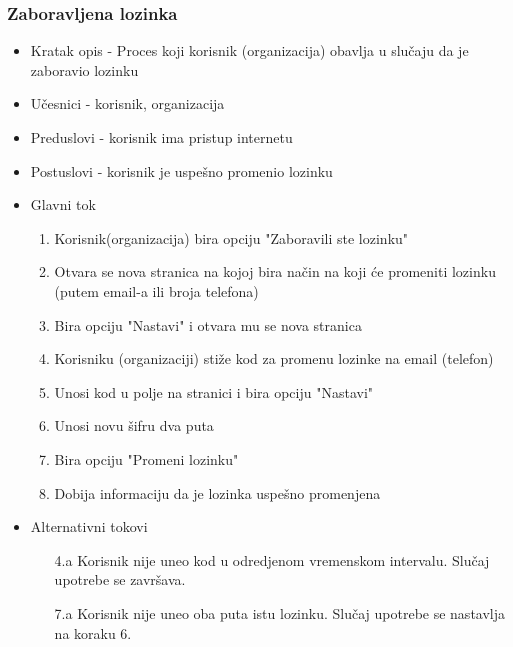 \subsubsection{Zaboravljena lozinka}
\begin{itemize}
    \item Kratak opis - Proces koji korisnik (organizacija) obavlja u slučaju da je zaboravio lozinku
    \item Učesnici - korisnik, organizacija
    \item Preduslovi - korisnik ima pristup internetu
    \item Postuslovi - korisnik je uspešno promenio lozinku
    \item Glavni tok
        \begin{enumerate}
	        \item Korisnik(organizacija) bira opciju "Zaboravili ste lozinku"
	        \item Otvara se nova stranica na kojoj bira način na koji će promeniti lozinku (putem email-a ili broja telefona)
	        \item Bira opciju "Nastavi" i otvara mu se nova stranica
	        \item Korisniku (organizaciji) stiže kod za promenu lozinke na email (telefon)
	        \item Unosi kod u polje na stranici i bira opciju "Nastavi"
	        \item Unosi novu šifru dva puta
	        \item Bira opciju "Promeni lozinku"
	        \item Dobija informaciju da je lozinka uspešno promenjena
        \end{enumerate}
    \item Alternativni tokovi
        \begin{itemize}
            \item[4.a] Korisnik nije uneo kod u odredjenom vremenskom intervalu. Slučaj upotrebe se završava.
            \item[7.a] Korisnik nije uneo oba puta istu lozinku. Slučaj upotrebe se nastavlja na koraku 6.
            
        \end{itemize}
\end{itemize}

